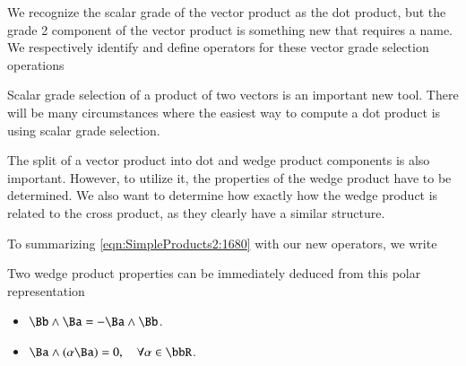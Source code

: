 We recognize the scalar grade of the vector product as the  dot product, but the grade 2 component of the vector product is something new that requires a name.
We respectively identify and define operators for these vector grade selection operations


Scalar grade selection of a product of two vectors is an important new tool.
There will be many circumstances where the easiest way to compute a dot product is using scalar grade selection.

The split of a vector product into dot and wedge product components is also important.
However, to utilize it, the properties of the wedge product have to be determined.
We also want to determine how exactly how the wedge product is related to the cross product, as they clearly have a similar structure.

To summarizing \cref{eqn:SimpleProducts2:1680} with our new operators, we write


Two wedge product properties can be immediately deduced from this polar representation

\begin{itemize}
\item \( \Bb \wedge \Ba = - \Ba \wedge \Bb \).
\item \( \Ba \wedge (\alpha \Ba) = 0, \quad \forall \alpha \in \bbR \).
\end{itemize}

